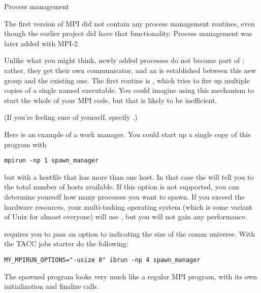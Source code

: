 
 {Process management}
\label{sec:mpi-dynamic}

The first version of MPI did not contain any process management
routines, even though the earlier  project did have
that functionality. Process management was later added with MPI-2.

Unlike what you might think, newly added processes do not become part
of ; rather, they get their own communicator, and an
 is established between this new group
and the existing one. The first routine is
, which tries to fire up multiple copies
of a single named executable. You could imagine using this mechanism
to start the whole of your MPI code, but that is likely to be inefficient.


(If you're feeling sure of yourself, specify .)

Here is an example of a work manager.
%
%
%
You could start up a single copy of this program with 
\begin{verbatim}
mpirun -np 1 spawn_manager
\end{verbatim}
but with a hostfile that has more than one host. In that case the
 will tell you to the total number of
hosts available. If this option is not supported, you can determine
yourself how many processes you want to spawn. If you exceed the
hardware resources, your multi-tasking operating system (which is some
variant of Unix for almost everyone) will use
, but you will not gain any performance.

\begin{taccnote}
 requires you to pass an option  to
 indicating the size of the comm universe. With the TACC
jobs starter  do the following:
\begin{verbatim}
MY_MPIRUN_OPTIONS="-usize 8" ibrun -np 4 spawn_manager
\end{verbatim}
\end{taccnote}
The spawned program looks very much like a regular MPI program, with
its own initialization and finalize calls.

